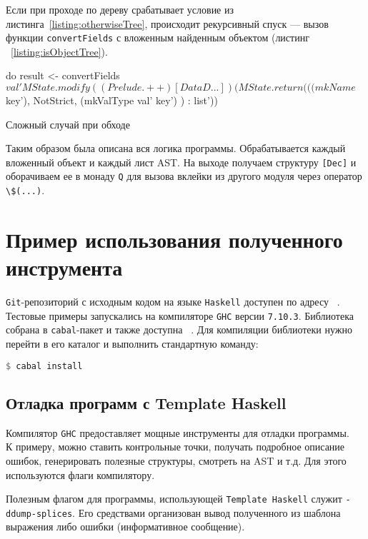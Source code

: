 Если при проходе по дереву срабатывает условие из листинга~\ref{listing:otherwiseTree}, происходит рекурсивный спуск --- вызов функции \lstinline{convertFields} с вложенным найденным объектом (листинг ~\ref{listing:isObjectTree}).

\begin{ListingEnv}[H]
\begin{Verb}
do
      result <- convertFields $ val'
      MState.modify ((Prelude.++) [DataD ... ])
      (MState.return (((mkName $  key'), NotStrict,
                                (mkValType val' key') ) : list'))
\end{Verb}
\caption{Сложный случай при обходе}
\label{listing:isObjectTree}
\end{ListingEnv} 

Таким образом была описана вся логика программы. Обрабатывается каждый вложенный объект и каждый лист AST. На выходе получаем структуру \lstinline{[Dec]} и оборачиваем ее в монаду \lstinline{Q} для вызова вклейки из другого модуля через оператор \lstinline{\$(...)}.

\chapter{Пример использования полученного инструмента}

\lstinline{Git}-репозиторий с исходным кодом на языке \lstinline{Haskell} доступен по адресу ~\cite{diploma}. Тестовые примеры запускались на компиляторе \lstinline{GHC} версии \lstinline{7.10.3}. Библиотека собрана в \lstinline{cabal}-пакет и также доступна ~\cite{diploma}. Для компиляции библиотеки нужно перейти в его каталог и выполнить стандартную команду:

\begin{lstlisting}[language=Haskell]
$ cabal install
\end{lstlisting}

\section{Отладка программ с Template Haskell}

Компилятор \lstinline{GHC} предоставляет мощные инструменты для отладки программы. ~\cite{debugGHC} К примеру, можно ставить контрольные точки, получать подробное описание ошибок, генерировать полезные структуры, смотреть на AST и т.д. Для этого используются флаги компилятору. 

Полезным флагом для программы, использующей \lstinline{Template Haskell} служит \lstinline{-ddump-splices}. Его средствами организован вывод полученного из шаблона выражения либо ошибки (информативное сообщение).

